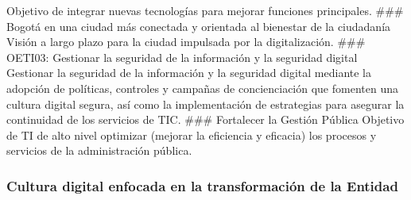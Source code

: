 \documentclass[
	a4paper, %
	12pt, %
]{include/CSSullivanBusinessReport}
\begin{document}
Objetivo de integrar nuevas tecnologías para mejorar funciones
principales. \#\#\# Bogotá en una ciudad más conectada y orientada al
bienestar de la ciudadanía Visión a largo plazo para la ciudad impulsada
por la digitalización. \#\#\# OETI03: Gestionar la seguridad de la
información y la seguridad digital Gestionar la seguridad de la
información y la seguridad digital mediante la adopción de políticas,
controles y campañas de concienciación que fomenten una cultura digital
segura, así como la implementación de estrategias para asegurar la
continuidad de los servicios de TIC. \#\#\# Fortalecer la Gestión
Pública Objetivo de TI de alto nivel optimizar (mejorar la eficiencia y
eficacia) los procesos y servicios de la administración pública.

\subsubsection{Cultura digital enfocada en la transformación de la
Entidad}\label{sec:cultura-digital-enfocada-en-la-transformaciuxf3n-de-la-entidad}
\end{document}
